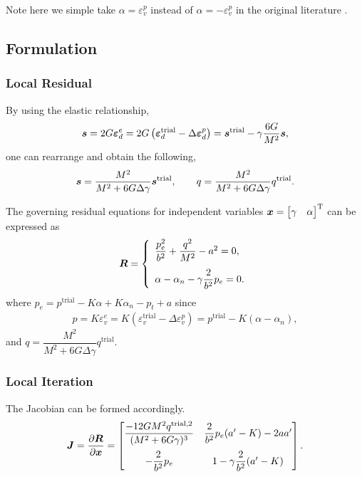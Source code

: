 Note here we simple take $\alpha=\varepsilon^p_v$ instead of $\alpha=-\varepsilon^p_v$ in the original literature \cite{SouzaNeto2008}.
\subsection{Formulation}
\subsubsection{Local Residual}
By using the elastic relationship,
\begin{gather}
\bm{s}=2G\bm{\varepsilon}^e_d=2G\left(\bm{\varepsilon}^\text{trial}_d-\Delta\bm{\varepsilon}^p_d\right)=\bm{s}^\text{trial}-\gamma\dfrac{6G}{M^2}\bm{s},
\end{gather}
one can rearrange and obtain the following,
\begin{gather}
\bm{s}=\dfrac{M^2}{M^2+6G\Delta\gamma}\bm{s}^\text{trial},\qquad
q=\dfrac{M^2}{M^2+6G\Delta\gamma}q^\text{trial}.
\end{gather}

The governing residual equations for independent variables $\bm{x}=\begin{bmatrix}\gamma&\alpha\end{bmatrix}^\mathrm{T}$ can be expressed as
\begin{gather}
\bm{R}=\left\{\begin{array}{l}
\dfrac{p_e^2}{b^2}+\dfrac{q^2}{M^2}-a^2=0,\\[4mm]
\alpha-\alpha_n-\gamma\dfrac{2}{b^2}p_e=0.
\end{array}\right.
\end{gather}
where $p_e=p^\text{trial}-K\alpha+K\alpha_n-p_t+a$ since
\begin{gather}
p=K\varepsilon^e_v=K\left(\varepsilon^\text{trial}_v-\Delta\varepsilon^p_v\right)=p^\text{trial}-K\left(\alpha-\alpha_n\right),
\end{gather}
and $q=\dfrac{M^2}{M^2+6G\Delta\gamma}q^\text{trial}$.
\subsubsection{Local Iteration}
The Jacobian can be formed accordingly.
\begin{gather}
\bm{J}=\dfrac{\partial{\bm{R}}}{\partial{\bm{x}}}=\begin{bmatrix}
\dfrac{-12GM^2q^{\text{trial},2}}{(M^2+6G\gamma)^3}&\dfrac{2}{b^2}p_e(a'-K)-2aa'\\[4mm]
-\dfrac{2}{b^2}p_e&1-\gamma\dfrac{2}{b^2}(a'-K)
\end{bmatrix}.
\end{gather}
